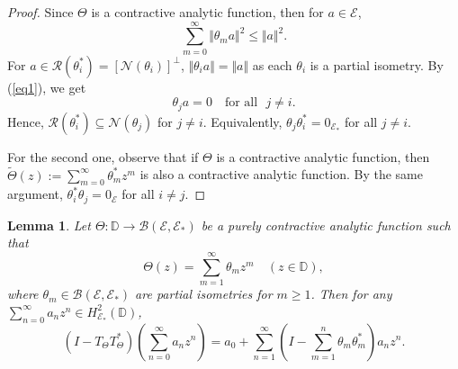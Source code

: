 \documentclass[12pt]{amsart}
\newcommand{\clb}{\mathcal{B}}
\newcommand{\cle}{\mathcal{E}}
\newcommand{\cln}{\mathcal{N}}
\newcommand{\clr}{\mathcal{R}}
\newcommand{\D}{\mathbb{D}}
\newcommand{\E}{\mathcal{E}}
\theoremstyle{definition}
\theoremstyle{plain}
\newtheorem{lem}[thm]{Lemma}
\theoremstyle{definition}
\numberwithin{equation}{section}
\begin{document}
\begin{proof}
 Since $\Theta$ is a contractive analytic function, then for $a \in \cle$,  
\begin{equation} \label{eq1}
\sum\limits_{m=0}^\infty \Vert \theta_m a\Vert ^2 \leq \Vert a\Vert ^2.
\end{equation}
For $a \in \clr ( \theta_i^*)=[\cln  (\theta_i)]^\perp$, $\Vert \theta_i a \Vert=\Vert a\Vert$ as each $\theta_i$ is a partial isometry. By (\ref{eq1}), we get 
\[
\theta_j a=0 \quad \text{for all~~} j \neq i. 
\]
Hence, $\clr  (\theta_i^*) \subseteq \cln  (\theta_j)$ for $j \neq i$. Equivalently, $\theta_j \theta_i^*=0_{\cle_*}$ for all $j \neq i$. 

For the second one, observe that if $\Theta$ is a contractive analytic function, then $\tilde{\Theta}( z):=\sum\limits_{m=0}^\infty   \theta_m^*z^m$ is also a contractive analytic function. By the same argument, $\theta_i^*\theta_j=0_\cle$ for all $i \neq j$.
\end{proof}


\begin{lem}\label{Function-Lemma}
Let $\Theta : \D \rightarrow \clb(\E,\E_*)$ be a purely contractive analytic function such that 
\[
\Theta( z)=\sum_{m=1}^\infty  \theta_mz^m \quad (z \in \D),
\]
where $\theta_m \in \mathcal{B}(\E,\E_*)$ are partial isometries for $m\geq 1$. Then for any
$\displaystyle \sum_{n=0}^{\infty}a_n z^n \in H^2_{\E_*}(\D)$,
\[
\left(I - T_{\Theta}T_{\Theta}^*\right)\left(\displaystyle \sum_{n=0}^{\infty}a_n z^n \right) 
= a_0 +  \sum_{n=1}^{\infty} \left( I - \sum_{m=1}^{n}\theta_m \theta_m^* \right) a_nz^n.
\]
\end{lem}
\end{document}
